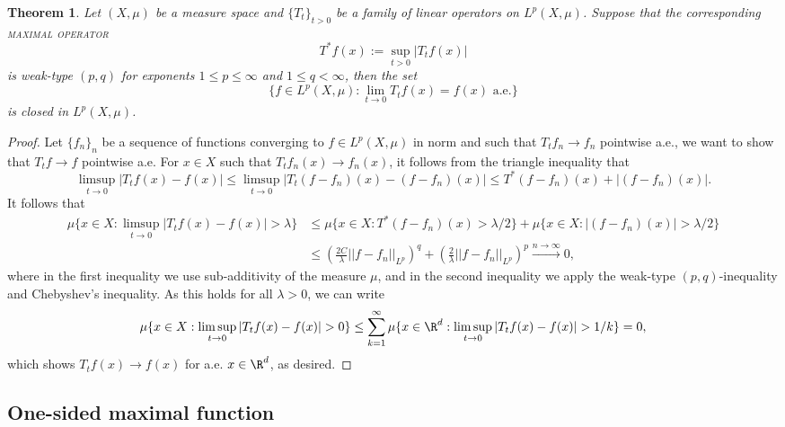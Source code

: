 \documentclass[reqno]{amsart}
\newtheorem{theorem}{Theorem}
\theoremstyle{definition}
\theoremstyle{remark}
\renewcommand{\emph}{\textsc}
\begin{document}
\begin{theorem}
	Let $(X, \mu)$ be a measure space and $\{ T_t \}_{t > 0}$ be a family of linear operators on $L^p (X, \mu)$. Suppose that the corresponding \emph{maximal operator}
		\[ T^* f (x) := \sup_{t > 0} |T_t f(x)| \]
	is weak-type $(p, q)$ for exponents $1 \leq p \leq \infty$ and $1 \leq q < \infty$, then the set
		\[ \{ f \in L^p (X, \mu) : \lim_{t \to 0} T_t f(x) = f(x) \text{ a.e.} \} \]
	is closed in $L^p (X, \mu)$. \label{thm:approxidentity}
\end{theorem}

\begin{proof}
	Let $\{ f_n \}_n$ be a sequence of functions converging to $f \in L^p (X, \mu)$ in norm and such that $T_t f_n \to f_n$ pointwise a.e., we want to show that $T_t f  \to f$ pointwise a.e. For $x \in X$ such that $T_t f_n (x) \to f_n (x)$, it follows from the triangle inequality that 
		\[ \limsup_{t \to 0} |T_t f(x) - f(x)| \leq \limsup_{t \to 0} |T_t (f - f_n) (x) - (f - f_n)(x)| \leq T^* (f - f_n)(x) + |(f - f_n)(x)|. \]
	It follows that
		\begin{align*}
			\mu \{ x \in X :  \limsup_{t \to 0} |T_t f(x) - f(x)| > \lambda \}
				&\leq \mu \{ x \in X : T^* (f - f_n)(x) > \lambda/2\} +  \mu\{ x \in X : |(f - f_n) (x)| > \lambda/2 \} \\
				&\leq \left( \frac{2C}{\lambda} ||f - f_n||_{L^p} \right)^q + \left( \frac2\lambda ||f - f_n||_{L^p} \right)^p \overset{n \to \infty}{\longrightarrow} 0,
		\end{align*}
	 where in the first inequality we use sub-additivity of the measure $\mu$, and in the second inequality we apply the weak-type $(p, q)$-inequality and Chebyshev's inequality. As this holds for all $\lambda > 0$, we can write
	 	\[ \mu \{ x \in X : \limsup_{t \to 0} |T_t f(x) - f(x)| > 0 \} \leq \sum_{k = 1}^\infty  \mu \{ x \in \R^d : \limsup_{t \to 0} |T_t f(x) - f(x)| > 1/k \} = 0, \]
	 which shows $T_t f(x) \to f(x)$ for a.e. $x \in \R^d$, as desired. 
\end{proof}




\subsection{One-sided maximal function}
\end{document}

